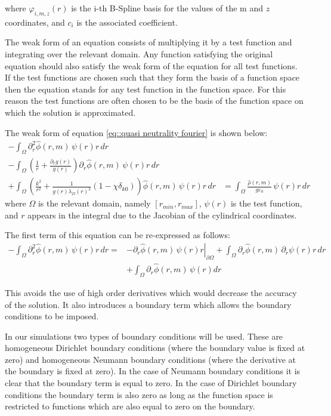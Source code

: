 where $\varphi_{i,m,z}(r)$ is the i-th B-Spline basis for the values of the m and $z$ coordinates, and $c_i$ is the associated coefficient.

The weak form of an equation consists of multiplying it by a test function and integrating over the relevant domain. Any function satisfying the original equation should also satisfy the weak form of the equation for all test functions. If the test functions are chosen such that they form the basis of a function space then the equation stands for any test function in the function space. For this reason the test functions are often chosen to be the basis of the function space on which the solution is approximated.

The weak form of equation \ref{eq::quasi neutrality fourier} is shown below:
\begin{align}
 -\int_\Omega\partial_r^2\hat{\phi}(r,m)\,\psi(r) r\, dr & \nonumber\\
 - \int_\Omega\left(\frac{1}{r}+\frac{\partial_rg(r)}{g(r)}\right) \partial_r\hat{\phi}(r,m)\,\psi(r) r\, dr & \nonumber\\
 + \int_\Omega\left(\frac{k^2}{r^2}+\frac{1}{g(r)\lambda_D(r)^2}(1-\chi\delta_{k0})\right)\hat{\phi}(r,m)\,\psi(r) r\, dr&=\int_\Omega\frac{\hat{\rho}(r,m)}{g\varepsilon_0}\,\psi(r) r\, dr \label{quasi neutrality weak}
\end{align}
where $\Omega$ is the relevant domain, namely $[r_{min},r_{max}]$, $\psi(r)$ is the test function, and $r$ appears in the integral due to the Jacobian of the cylindrical coordinates.

The first term of this equation can be re-expressed as follows:
\begin{align}
 -\int_\Omega\partial_r^2\hat{\phi}(r,m)\,\psi(r)r\, dr =& \left.-\partial_r \hat{\phi}(r,m)\,\psi(r) r \right|_{\partial\Omega}+\int_\Omega\partial_r\hat{\phi}(r,m)\,\partial_r\psi(r)r\, dr\nonumber\\
 &+\int_\Omega\partial_r\hat{\phi}(r,m)\,\psi(r) dr\label{eq::FE boundary}
\end{align}

This avoids the use of high order derivatives which would decrease the accuracy of the solution. It also introduces a boundary term which allows the boundary conditions to be imposed.

In our simulations two types of boundary conditions will be used. These are homogeneous Dirichlet boundary conditions (where the boundary value is fixed at zero) and homogeneous Neumann boundary conditions (where the derivative at the boundary is fixed at zero). In the case of Neumann boundary conditions it is clear that the boundary term is equal to zero. In the case of Dirichlet boundary conditions the boundary term is also zero as long as the function space is restricted to functions which are also equal to zero on the boundary.

